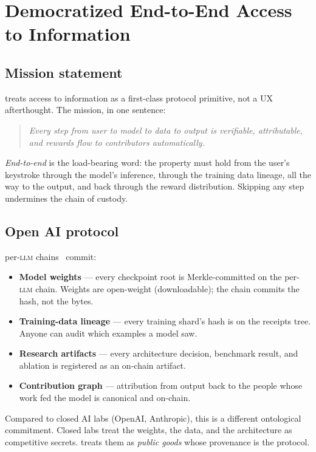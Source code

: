 \section{Democratized End-to-End Access to Information}
\label{sec:access}

\subsection{Mission statement}

\Zoo{} treats access to information as a first-class protocol primitive,
not a UX afterthought. The mission, in one sentence:

\begin{quote}\itshape
Every step from user to model to data to output is verifiable,
attributable, and rewards flow to contributors automatically.
\end{quote}

\emph{End-to-end} is the load-bearing word: the property must hold from
the user's keystroke through the model's inference, through the training
data lineage, all the way to the output, and back through the reward
distribution. Skipping any step undermines the chain of custody.

\subsection{Open AI protocol}

\Zoo{} per-\textsc{llm} chains~\cite{zoo-per-llm-chains} commit:

\begin{itemize}[nosep,leftmargin=1.2em]
\item \textbf{Model weights} --- every checkpoint root is Merkle-committed
  on the per-\textsc{llm} chain. Weights are open-weight (downloadable);
  the chain commits the hash, not the bytes.
\item \textbf{Training-data lineage} --- every training shard's hash is
  on the receipts tree. Anyone can audit which examples a model saw.
\item \textbf{Research artifacts} --- every architecture decision,
  benchmark result, and ablation is registered as an on-chain artifact.
\item \textbf{Contribution graph} --- attribution from output back to
  the people whose work fed the model is canonical and on-chain.
\end{itemize}

Compared to closed AI labs (OpenAI, Anthropic), this is a different
ontological commitment. Closed labs treat the weights, the data, and
the architecture as competitive secrets. \Zoo{} treats them as
\emph{public goods} whose provenance is the protocol.

